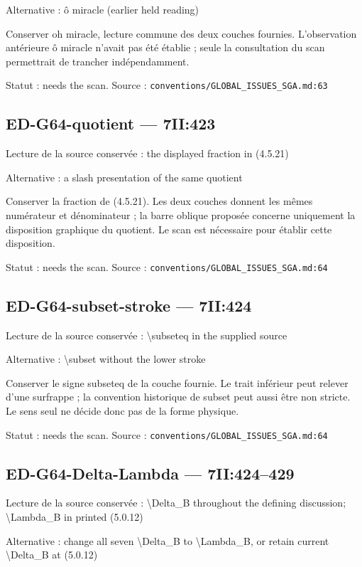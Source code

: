 Alternative : ô miracle (earlier held reading)

Conserver oh miracle, lecture commune des deux couches fournies. L’observation antérieure ô miracle n’avait pas été établie ; seule la consultation du scan permettrait de trancher indépendamment.

Statut : needs the scan. Source : \nolinkurl{conventions/GLOBAL_ISSUES_SGA.md:63}

\subsection*{ED-G64-quotient — 7II:423}

Lecture de la source conservée : the displayed fraction in (4.5.21)

Alternative : a slash presentation of the same quotient

Conserver la fraction de (4.5.21). Les deux couches donnent les mêmes numérateur et dénominateur ; la barre oblique proposée concerne uniquement la disposition graphique du quotient. Le scan est nécessaire pour établir cette disposition.

Statut : needs the scan. Source : \nolinkurl{conventions/GLOBAL_ISSUES_SGA.md:64}

\subsection*{ED-G64-subset-stroke — 7II:424}

Lecture de la source conservée : \textbackslash{}subseteq in the supplied source

Alternative : \textbackslash{}subset without the lower stroke

Conserver le signe subseteq de la couche fournie. Le trait inférieur peut relever d’une surfrappe ; la convention historique de subset peut aussi être non stricte. Le sens seul ne décide donc pas de la forme physique.

Statut : needs the scan. Source : \nolinkurl{conventions/GLOBAL_ISSUES_SGA.md:64}

\subsection*{ED-G64-Delta-Lambda — 7II:424–429}

Lecture de la source conservée : \textbackslash{}Delta\_B throughout the defining discussion; \textbackslash{}Lambda\_B in printed (5.0.12)

Alternative : change all seven \textbackslash{}Delta\_B to \textbackslash{}Lambda\_B, or retain current \textbackslash{}Delta\_B at (5.0.12)


